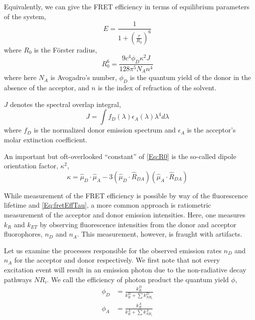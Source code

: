 \documentclass{article}
\newcommand{\NR}{\ensuremath{\mathit{NR}}}          %
\newcommand{\ET}{\ensuremath{\mathit{ET}}}          %
\begin{document}
Equivalently, we can give the FRET efficiency in terms of equilibrium
parameters of the system,
\begin{equation}
  E = \frac{1}{1 + \left( \frac{r}{R_0} \right)^6}
  \label{Eq:fretEff}
\end{equation}
where $R_0$ is the F\"orster radius,
\begin{equation}
  R_0^6 = \frac{9 c^4 \phi_D \kappa^2 J}{128 \pi^5 N_A n^4}
  \label{Eq:R0}
\end{equation}
where here $N_A$ is Avogadro's number, $\phi_D$ is the quantum yield of the
donor in the absence of the acceptor, and $n$ is the index of
refraction of the solvent.

$J$ denotes the spectral overlap integral,
\[ J = \int f_D(\lambda) \epsilon_A(\lambda) \lambda^4 d\lambda \]
where $f_D$ is the normalized donor emission spectrum and $\epsilon_A$
is the acceptor's molar extinction coefficient.

An important but oft-overlooked ``constant'' of \eqref{Eq:R0} is
the so-called dipole orientation factor, $\kappa^2$,
\begin{equation}
  \kappa = \hat\mu_D \cdot \hat\mu_A - 3(\hat\mu_D \cdot \hat R_{DA}) (\hat\mu_A \cdot \hat R_{DA})
  \label{Eq:kappa}
\end{equation}

While measurement of the FRET efficiency is possible by way of the
fluorescence lifetime and \eqref{Eq:fretEffTau}, a more common
approach is ratiometric measurement of the acceptor and donor emission
intensities. Here, one measures $k_R$ and $k_\ET$ by observing
fluorescence intensities from the donor and acceptor fluorophores,
$n_D$ and $n_A$. This measurement, however, is fraught with
artifacts.

Let us examine the processes responsible for the observed emission rates
$n_D$ and $n_A$ for the acceptor and donor respectively. We first note
that not every excitation event will result in an emission photon due
to the non-radiative decay pathways $\NR_i$. We call the efficiency of
photon product the quantum yield $\phi$,
\begin{align*}
  \phi_D & = \frac{k^D_R}{k^D_R + \sum k^D_{\NR_i}} \\
  \phi_A & = \frac{k^A_R}{k^A_R + \sum k^A_{\NR_i}} \\
\end{align*}
\end{document}
